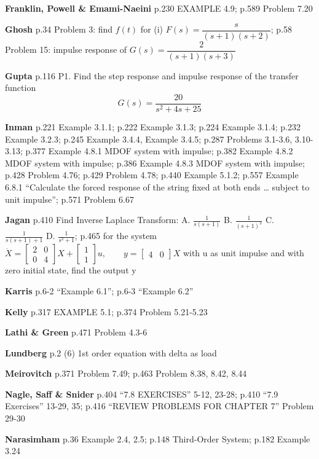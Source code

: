 \documentclass[
  11pt,
]{article}
\begin{document}
\textbf{Franklin, Powell \& Emami-Naeini} p.230 EXAMPLE 4.9; p.589
Problem 7.20

\textbf{Ghosh} p.34 Problem 3: find \(f(t)\) for (i)
\(F(s)=\dfrac{s}{(s+1)(s+2)}\); p.58 Problem 15: impulse response of
\(G(s)=\dfrac{2}{(s+1)(s+3)}\)

\textbf{Gupta} p.116 P1. Find the step response and impulse response of
the transfer function \[G(s) = \frac{20}{s^2 + 4s + 25}\]

\textbf{Inman} p.221 Example 3.1.1; p.222 Example 3.1.3; p.224 Example
3.1.4; p.232 Example 3.2.3; p.245 Example 3.4.4, Example 3.4.5; p.287
Problems 3.1-3.6, 3.10-3.13; p.377 Example 4.8.1 MDOF system with
impulse; p.382 Example 4.8.2 MDOF system with impulse; p.386 Example
4.8.3 MDOF system with impulse; p.428 Problem 4.76; p.429 Problem 4.78;
p.440 Example 5.1.2; p.557 Example 6.8.1 ``Calculate the forced response
of the string fixed at both ends \ldots{} subject to unit impulse'';
p.571 Problem 6.67

\textbf{Jagan} p.410 Find Inverse Laplace Transform: A.
\(\frac{1}{s(s+1)}\) B. \(\frac{1}{(s+1)^2}\) C.
\(\frac{1}{s(s+1) + 1}\) D. \(\frac{1}{s^2 + 1}\); p.465 for the system
\(\dot{X} = \begin{bmatrix} 2 & 0 \\ 0 & 4 \end{bmatrix} X + \begin{bmatrix} 1 \\ 1 \end{bmatrix} u, \qquad y = \begin{bmatrix} 4 & 0 \end{bmatrix} X\)
with u as unit impulse and with zero initial state, find the output y

\textbf{Karris} p.6-2 ``Example 6.1''; p.6-3 ``Example 6.2''

\textbf{Kelly} p.317 EXAMPLE 5.1; p.374 Problem 5.21-5.23

\textbf{Lathi \& Green} p.471 Problem 4.3-6

\textbf{Lundberg} p.2 (6) 1st order equation with delta as load

\textbf{Meirovitch} p.371 Problem 7.49; p.463 Problem 8.38, 8.42, 8.44

\textbf{Nagle, Saff \& Snider} p.404 ``7.8 EXERCISES'' 5-12, 23-28;
p.410 ``7.9 Exercises'' 13-29, 35; p.416 ``REVIEW PROBLEMS FOR CHAPTER
7'' Problem 29-30

\textbf{Narasimham} p.36 Example 2.4, 2.5; p.148 Third-Order System;
p.182 Example 3.24
\end{document}
